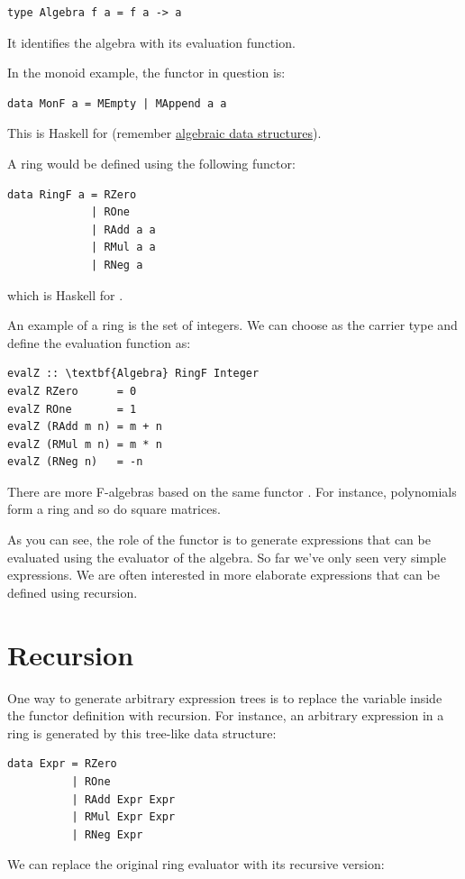 \begin{verbatim}
type Algebra f a = f a -> a
\end{verbatim}
It identifies the algebra with its evaluation function.

In the monoid example, the functor in question is:

\begin{verbatim}
data MonF a = MEmpty | MAppend a a
\end{verbatim}
This is Haskell for  (remember
\hyperref[simple-algebraic-data-types]{algebraic
data structures}).

A ring would be defined using the following functor:

\begin{verbatim}
data RingF a = RZero
             | ROne
             | RAdd a a
             | RMul a a
             | RNeg a
\end{verbatim}
which is Haskell for .

An example of a ring is the set of integers. We can choose
 as the carrier type and define the evaluation function
as:

\begin{Verbatim}[commandchars=\\\{\}]
evalZ :: \textbf{Algebra} RingF Integer
evalZ RZero      = 0
evalZ ROne       = 1
evalZ (RAdd m n) = m + n
evalZ (RMul m n) = m * n
evalZ (RNeg n)   = -n
\end{Verbatim}
There are more F-algebras based on the same functor . For
instance, polynomials form a ring and so do square matrices.

As you can see, the role of the functor is to generate expressions that
can be evaluated using the evaluator of the algebra. So far we've only
seen very simple expressions. We are often interested in more elaborate
expressions that can be defined using recursion.

\section{Recursion}\label{recursion}

One way to generate arbitrary expression trees is to replace the
variable  inside the functor definition with recursion. For
instance, an arbitrary expression in a ring is generated by this
tree-like data structure:

\begin{verbatim}
data Expr = RZero 
          | ROne
          | RAdd Expr Expr
          | RMul Expr Expr
          | RNeg Expr
\end{verbatim}
We can replace the original ring evaluator with its recursive version:

